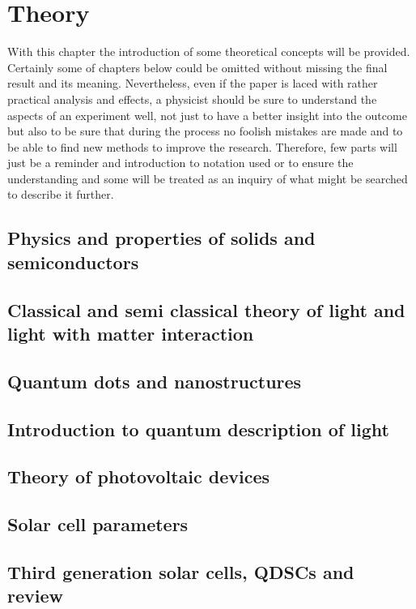 \chapter{Theory}

With this chapter the introduction of some theoretical concepts will be provided. Certainly some of chapters below could be omitted without missing the final result and its meaning. Nevertheless, even if the paper is laced with rather practical analysis and effects, a physicist should be sure to understand the aspects of an experiment well, not just to have a better insight into the outcome but also to be sure that during the process no foolish mistakes are made and to be able to find new methods to improve the research. Therefore, few parts will just be a reminder and introduction to notation used or to ensure the understanding and some will be treated as an inquiry of what might be searched to describe it further. 

\section{Physics and properties of solids and semiconductors}

\section{Classical and semi classical theory of light and light with matter interaction}

\section{Quantum dots and nanostructures}

\section{Introduction to quantum description of light}

\section{Theory of photovoltaic devices}

\section{Solar cell parameters}

\section{Third generation solar cells, QDSCs and review}